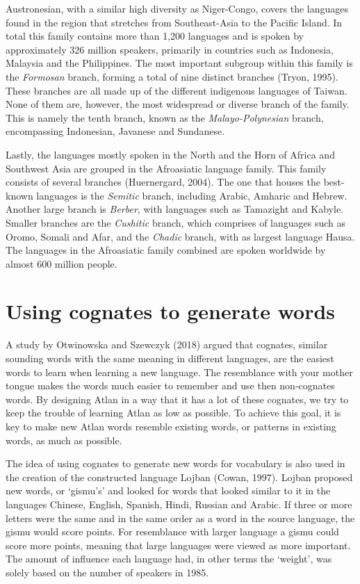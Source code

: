 Austronesian, with a similar high diversity as Niger-Congo, covers the languages found in the region that stretches from Southeast-Asia to the Pacific Island. In total this family contains more than 1,200 languages and is spoken by approximately 326 million speakers, primarily in countries such as Indonesia, Malaysia and the Philippines. The most important subgroup within this family is the \textit{Formosan} branch, forming a total of nine distinct branches (Tryon, 1995). These branches are all made up of the different indigenous languages of Taiwan. None of them are, however, the most widespread or diverse branch of the family. This is namely the tenth branch, known as the \textit{Malayo-Polynesian} branch, encompassing Indonesian, Javanese and Sundanese.  

Lastly, the languages mostly spoken in the North and the Horn of Africa and Southwest Asia are grouped in the Afroasiatic language family.  This family consists of several branches (Huernergard, 2004). The one that houses the best-known languages is the \textit{Semitic} branch, including Arabic, Amharic and Hebrew. Another large branch is \textit{Berber}, with languages such as Tamazight and Kabyle. Smaller branches are the \textit{Cushitic} branch, which comprises of languages such as Oromo, Somali and Afar, and the \textit{Chadic} branch, with as largest language Hausa. The languages in the Afroasiatic family combined are spoken worldwide by almost 600 million people. 


\section{Using cognates to generate words}


A study by Otwinowska and Szewczyk (2018) argued that cognates, similar sounding words with the same meaning in different languages, are the easiest words to learn when learning a new language. The resemblance with your mother tongue makes the words much easier to remember and use then non-cognates words. By designing Atlan in a way that it has a lot of these cognates, we try to keep the trouble of learning Atlan as low as possible. To achieve this goal, it is key to make new Atlan words resemble existing words, or patterns in existing words, as much as possible. 

The idea of using cognates to generate new words for vocabulary is also used in the creation of the constructed language Lojban (Cowan, 1997).  Lojban proposed new words, or ‘gismu’s’ and looked for words that looked similar to it in the languages Chinese, English, Spanish, Hindi, Russian and Arabic. If three or more letters were the same and in the same order as a word in the source language, the gismu would score points. For resemblance with larger language a gismu could score more points, meaning that large languages were viewed as more important. The amount of influence each language had, in other terms the ‘weight’, was solely based on the number of speakers in 1985.  

